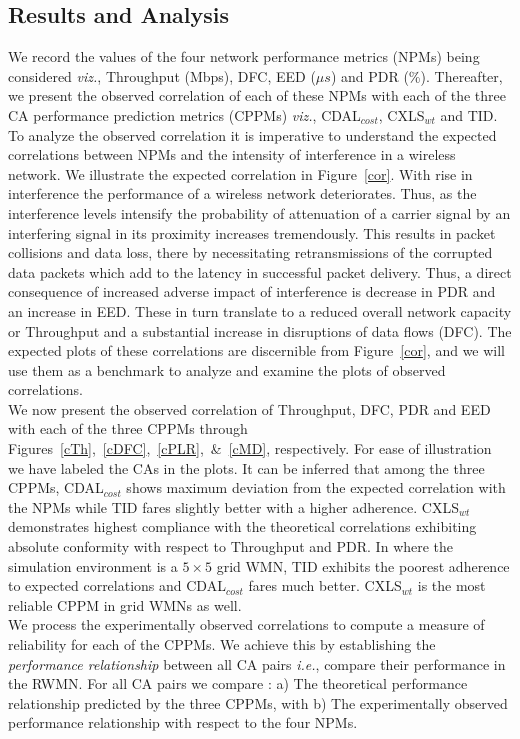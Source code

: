 \documentclass[conference]{IEEEtran}
\begin{document}
 \subsection{Results and Analysis}
We record the values of the four network performance metrics (NPMs) being considered \emph{viz.}, Throughput (Mbps), DFC, EED ($\mu s$) and PDR (\%). Thereafter, we present the observed correlation of each of these NPMs with each of the three CA performance prediction metrics (CPPMs) \emph{viz.}, CDAL$_{cost}$,  CXLS$_{wt}$ and TID. To analyze the observed correlation it is imperative to understand the expected correlations between NPMs and the intensity of interference in a wireless network. We illustrate the expected correlation in Figure~\ref{cor}. With rise in interference the performance of a wireless network deteriorates. Thus, as the interference levels intensify the probability of attenuation of a carrier signal by an interfering signal in its proximity increases tremendously. This results in packet collisions and data loss, there by necessitating retransmissions of the corrupted data packets which add to the latency in successful packet delivery. Thus, a direct consequence of increased adverse 
impact of interference is decrease in PDR and an increase in EED. These in turn translate to a reduced overall network capacity or Throughput and a substantial increase in disruptions of data flows (DFC). The expected plots of these correlations are discernible from Figure~\ref{cor}, and we will use them as a benchmark to analyze and examine the plots of observed correlations.\\
We now present the observed correlation of Throughput, DFC, PDR and EED with each of the three CPPMs through Figures~\ref{cTh},~\ref{cDFC},~\ref{cPLR},~\&~\ref{cMD}, respectively. For ease of illustration we have labeled the CAs in the plots.
It can be inferred that among the three CPPMs, CDAL$_{cost}$ shows maximum deviation from the expected correlation with the NPMs while TID fares slightly better with a higher adherence. CXLS$_{wt}$ demonstrates highest compliance with the theoretical correlations exhibiting absolute conformity with respect to Throughput and PDR. In \cite{Manas4} where the simulation environment is a $5\times5$ grid WMN, TID exhibits the poorest adherence to expected correlations and CDAL$_{cost}$ fares much better. CXLS$_{wt}$ is the most reliable CPPM in grid WMNs as well.\\
We process the experimentally observed correlations to compute a measure of reliability for each of the CPPMs. We achieve this by establishing the \textit{performance relationship} between all CA pairs \emph{i.e.}, compare their performance in the RWMN. For all CA pairs we compare : a) The theoretical performance relationship predicted by the three CPPMs, with b) The experimentally observed performance relationship with respect to the four NPMs.\\
\end{document}
